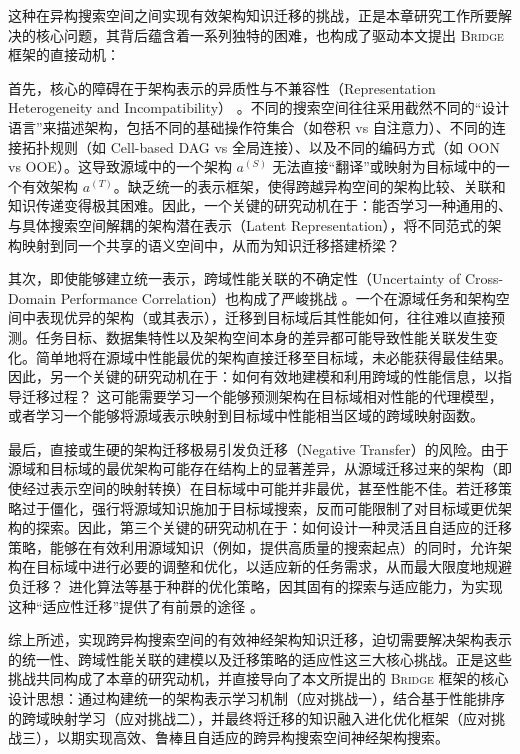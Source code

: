 \documentclass[../main.tex]{subfiles}
\begin{document}
这种在异构搜索空间之间实现有效架构知识迁移的挑战，正是本章研究工作所要解决的核心问题，其背后蕴含着一系列独特的困难，也构成了驱动本文提出 \textsc{Bridge} 框架的直接动机：

首先，核心的障碍在于架构表示的异质性与不兼容性（Representation Heterogeneity and Incompatibility） 。不同的搜索空间往往采用截然不同的“设计语言”来描述架构，包括不同的基础操作符集合（如卷积 vs 自注意力）、不同的连接拓扑规则（如 Cell-based DAG vs 全局连接）、以及不同的编码方式（如 OON vs OOE）。这导致源域中的一个架构 $a^{(S)}$ 无法直接“翻译”或映射为目标域中的一个有效架构 $a^{(T)}$。缺乏统一的表示框架，使得跨越异构空间的架构比较、关联和知识传递变得极其困难。因此，一个关键的研究动机在于：能否学习一种通用的、与具体搜索空间解耦的架构潜在表示（Latent Representation），将不同范式的架构映射到同一个共享的语义空间中，从而为知识迁移搭建桥梁？

其次，即使能够建立统一表示，跨域性能关联的不确定性（Uncertainty of Cross-Domain Performance Correlation）也构成了严峻挑战 。一个在源域任务和架构空间中表现优异的架构（或其表示），迁移到目标域后其性能如何，往往难以直接预测。任务目标、数据集特性以及架构空间本身的差异都可能导致性能关联发生变化。简单地将在源域中性能最优的架构直接迁移至目标域，未必能获得最佳结果。因此，另一个关键的研究动机在于：如何有效地建模和利用跨域的性能信息，以指导迁移过程？ 这可能需要学习一个能够预测架构在目标域相对性能的代理模型，或者学习一个能够将源域表示映射到目标域中性能相当区域的跨域映射函数。

最后，直接或生硬的架构迁移极易引发负迁移（Negative Transfer）的风险。由于源域和目标域的最优架构可能存在结构上的显著差异，从源域迁移过来的架构（即使经过表示空间的映射转换）在目标域中可能并非最优，甚至性能不佳。若迁移策略过于僵化，强行将源域知识施加于目标域搜索，反而可能限制了对目标域更优架构的探索。因此，第三个关键的研究动机在于：如何设计一种灵活且自适应的迁移策略，能够在有效利用源域知识（例如，提供高质量的搜索起点）的同时，允许架构在目标域中进行必要的调整和优化，以适应新的任务需求，从而最大限度地规避负迁移？ 进化算法等基于种群的优化策略，因其固有的探索与适应能力，为实现这种“适应性迁移”提供了有前景的途径 。

综上所述，实现跨异构搜索空间的有效神经架构知识迁移，迫切需要解决架构表示的统一性、跨域性能关联的建模以及迁移策略的适应性这三大核心挑战。正是这些挑战共同构成了本章的研究动机，并直接导向了本文所提出的 \textsc{Bridge} 框架的核心设计思想：通过构建统一的架构表示学习机制（应对挑战一），结合基于性能排序的跨域映射学习（应对挑战二），并最终将迁移的知识融入进化优化框架（应对挑战三），以期实现高效、鲁棒且自适应的跨异构搜索空间神经架构搜索。
\end{document}
